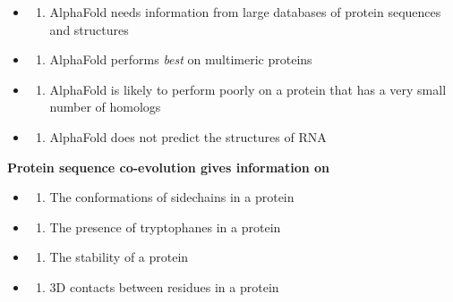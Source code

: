 \documentclass[
]{scrbook}
\providecommand{\tightlist}{%
  \setlength{\itemsep}{0pt}\setlength{\parskip}{0pt}}\usepackage{longtable,booktabs,array}
\begin{document}
\begin{itemize}
\tightlist
\item
  \begin{enumerate}
  \def\labelenumi{(\Alph{enumi})}
  \tightlist
  \item
    AlphaFold needs information from large databases of protein
    sequences and structures\\
  \end{enumerate}
\item
  \begin{enumerate}
  \def\labelenumi{(\Alph{enumi})}
  \setcounter{enumi}{1}
  \tightlist
  \item
    AlphaFold performs \emph{best} on multimeric proteins\\
  \end{enumerate}
\item
  \begin{enumerate}
  \def\labelenumi{(\Alph{enumi})}
  \setcounter{enumi}{2}
  \tightlist
  \item
    AlphaFold is likely to perform poorly on a protein that has a very
    small number of homologs\\
  \end{enumerate}
\item
  \begin{enumerate}
  \def\labelenumi{(\Alph{enumi})}
  \setcounter{enumi}{3}
  \tightlist
  \item
    AlphaFold does not predict the structures of RNA
  \end{enumerate}
\end{itemize}

\textbf{Protein sequence co-evolution gives information on}

\begin{itemize}
\tightlist
\item
  \begin{enumerate}
  \def\labelenumi{(\Alph{enumi})}
  \tightlist
  \item
    The conformations of sidechains in a protein\\
  \end{enumerate}
\item
  \begin{enumerate}
  \def\labelenumi{(\Alph{enumi})}
  \setcounter{enumi}{1}
  \tightlist
  \item
    The presence of tryptophanes in a protein\\
  \end{enumerate}
\item
  \begin{enumerate}
  \def\labelenumi{(\Alph{enumi})}
  \setcounter{enumi}{2}
  \tightlist
  \item
    The stability of a protein\\
  \end{enumerate}
\item
  \begin{enumerate}
  \def\labelenumi{(\Alph{enumi})}
  \setcounter{enumi}{3}
  \tightlist
  \item
    3D contacts between residues in a protein
  \end{enumerate}
\end{itemize}
\end{document}

